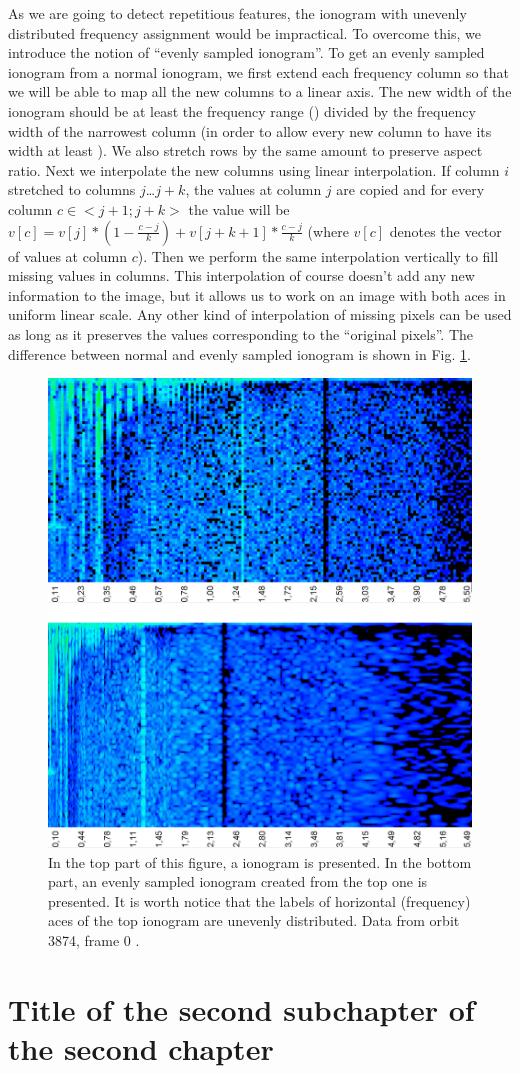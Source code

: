 As we are going to detect repetitious features, the ionogram with unevenly distributed frequency assignment would be impractical. To overcome this, we introduce the notion of ``evenly sampled ionogram''. To get an evenly sampled ionogram from a normal ionogram, we first extend each frequency column so that we will be able to map all the new columns to a linear axis. The new width of the ionogram should be at least the frequency range () divided by the frequency width of the narrowest column (in order to allow every new column to have its width at least ). We also stretch rows by the same amount to preserve aspect ratio. Next we interpolate the new columns using linear interpolation. If column $i$ stretched to columns $j$\ldots$j+k$, the values at column $j$ are copied and for every column $c\in<j+1; j+k>$ the value will be $v[c] = v[j]*(1-\frac{c-j}{k}) + v[j+k+1]*\frac{c-j}{k}$ (where $v[c]$ denotes the vector of values at column $c$). Then we perform the same interpolation vertically to fill missing values in columns. This interpolation of course doesn't add any new information to the image, but it allows us to work on an image with both aces in uniform linear scale. Any other kind of interpolation of missing pixels can be used as long as it preserves the values corresponding to the ``original pixels''. The difference between normal and evenly sampled ionogram is shown in Fig. \ref{fig:even_uneven_iono}.

\begin{figure}
	\centering
	\includegraphics[width=140mm]{images/even_and_uneven_ionogram.png}
	\caption{In the top part of this figure, a ionogram is presented. In the bottom part, an evenly sampled ionogram created from the top one is presented. It is worth notice that the labels of horizontal (frequency) aces of the top ionogram are unevenly distributed. Data from orbit 3874, frame 0 \citep{FTP}.}
	\label{fig:even_uneven_iono}
\end{figure}

\section{Title of the second subchapter of the second chapter}
